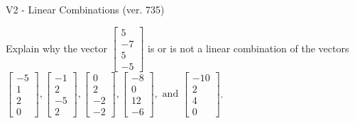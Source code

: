 \begin{exercise}
  \begin{exerciseTitle}V2 - Linear Combinations (ver. 735)\end{exerciseTitle}
  \begin{exerciseStatement}
    Explain why the vector \(\left[\begin{array}{c}
5 \\
-7 \\
5 \\
-5
\end{array}\right]\)  is or is not a linear 
	combination of the vectors \(\left[\begin{array}{c}
-5 \\
1 \\
2 \\
0
\end{array}\right] , \left[\begin{array}{c}
-1 \\
2 \\
-5 \\
2
\end{array}\right] , \left[\begin{array}{c}
0 \\
2 \\
-2 \\
-2
\end{array}\right] , \left[\begin{array}{c}
-8 \\
0 \\
12 \\
-6
\end{array}\right] , \text{ and } \left[\begin{array}{c}
-10 \\
2 \\
4 \\
0
\end{array}\right]\).
	



\end{exerciseStatement}
\end{exercise}
